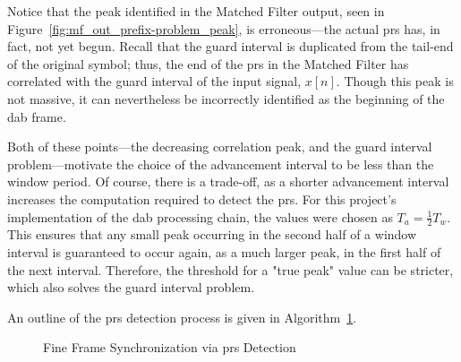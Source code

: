 \documentclass[class=report,11pt,crop=false]{standalone}
\begin{document}
Notice that the peak identified in the Matched Filter output, seen in Figure~\ref{fig:mf_out_prefix-problem_peak}, is erroneous---the actual \gls{prs} has, in fact, not yet begun. Recall that the guard interval is duplicated from the tail-end of the original symbol; thus, the end of the \gls{prs} in the Matched Filter has correlated with the guard interval of the input signal, \(x[n]\). Though this peak is not massive, it can nevertheless be incorrectly identified as the beginning of the \gls{dab} frame.

Both of these points---the decreasing correlation peak, and the guard interval problem---motivate the choice of the advancement interval to be less than the window period. Of course, there is a trade-off, as a shorter advancement interval increases the computation required to detect the \gls{prs}. For this project's implementation of the \gls{dab} processing chain, the values were chosen as \(T_a = \frac{1}{2} T_w\). This ensures that any small peak occurring in the second half of a window interval is guaranteed to occur again, as a much larger peak, in the first half of the next interval. Therefore, the threshold for a "true peak" value can be stricter, which also solves the guard interval problem.

An outline of the \gls{prs} detection process is given in Algorithm~\ref{alg:prs_detect}.

\begin{figure}[ht]
  \vspace{0.5cm}
  \centering
  \captionsetup{type=figure}
  \begin{minipage}{.75\linewidth}
    \begin{algorithm}[H]
      \caption{Fine Frame Synchronization via \gls{prs} Detection\label{alg:prs_detect}}

      \DontPrintSemicolon
      \SetAlgoLined


      \BlankLine
      \vspace{0.5cm}
    \end{algorithm}
  \end{minipage}
\end{figure}
\end{document}
